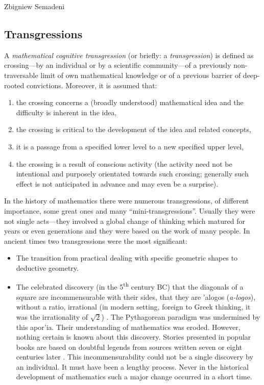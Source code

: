 \begin{artengenv}{Zbigniew Semadeni}
\subsection{Transgressions}
A \textit{mathematical cognitive transgression} (or briefly: a \textit{transgression}) 
is defined as crossing---by an individual or by a scientific community---of 
a previously non-traversable limit of own mathematical knowledge or 
of a previous barrier of deep-rooted convictions. Moreover, it is assumed that: \par
\begin{enumerate} 
\item the crossing concerns a (broadly understood) mathematical idea and the difficulty 
is inherent in the idea, 
\item the crossing is critical to the development of the idea and related 
concepts, 
\item it is a passage from a specified lower level to a new specified upper level, 
\item the crossing is a result of conscious activity (the activity need not 
be intentional and purposely orientated towards such crossing; generally such 
effect is not anticipated in advance and may even be a surprise). 
\end{enumerate} 

In the history of mathematics there were numerous transgressions, of different 
importance, some great ones and many ``mini-transgressions''. Usually they were 
not single acts---they involved a global change of thinking which matured for 
years or even generations and they were based on the work of many people. In ancient 
times two transgressions were the most significant: 
\begin{itemize}
\item The transition from practical dealing with specific geometric shapes to deductive 
geometry.  
\item The celebrated discovery (in the 5\textsuperscript{th} century BC) that the diagonals of a 
square are incommensurable with their sides, that they are 
\textgreek{'alogos} 
(\textit{a-logos}), without a ratio, irrational (in modern setting, foreign to Greek 
thinking, it was the irrationality of $\sqrt{2}$) \parencite[pp.80-81]{Baszmakowa}. 
The Pythagorean paradigm was undermined by this \textgreek{apor'ia}.
Their understanding of mathematics was eroded. However, nothing certain is 
known about this discovery. Stories presented in popular books are based on 
doubtful legends from sources written seven or eight centuries later 
\parencite[p.21, 51]{Knorr}. This incommensurability could not be a single 
discovery by an individual. It must have been a lengthy process. Never in the 
historical development of mathematics such a major change occurred in a short time. 
\end{itemize}


\end{artengenv}
